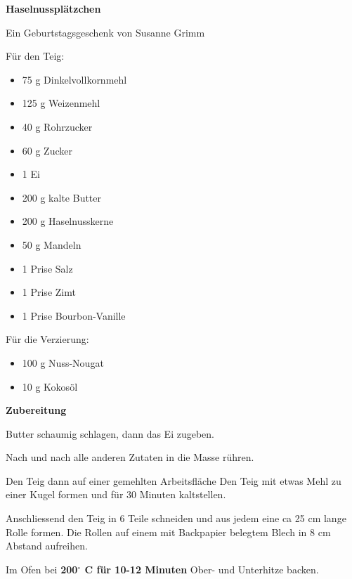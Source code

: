 

\parindent0pt	

\pagestyle{empty}


\textbf{{\LARGE Haselnussplätzchen}}%

\hrulefill

Ein Geburtstagsgeschenk von Susanne Grimm
\vspace*{\fill}
\begin{multicols}{2}	

Für den Teig:
\begin{itemize}
\item 75 g 	Dinkelvollkornmehl
\item 125 g 	Weizenmehl
\item 40 g 	Rohrzucker
\item 60 g 	Zucker
\item 1 	Ei
\item 200 g	kalte Butter
\item 200 g 	Haselnusskerne
\item 50 g 	Mandeln
\item 1 Prise	Salz
\item 1 Prise	Zimt
\item 1 Prise	Bourbon-Vanille
\end{itemize}

Für die Verzierung: 
\begin{itemize}
\item 100 g	Nuss-Nougat
\item 10 g	Kokosöl 	
\end{itemize}
\end{multicols}
\vfill									%




\vfill
\newpage
\textbf{{\LARGE Zubereitung}}%

\hrulefill

\vspace*{\fill}
\begin{multicols}{2}



Butter schaumig schlagen, dann das Ei zugeben.

Nach und nach alle anderen Zutaten in die Masse rühren.\newline

Den Teig dann auf einer gemehlten Arbeitsfläche
Den Teig mit etwas Mehl zu einer Kugel formen und für 30 Minuten kaltstellen.\newline

Anschliessend den Teig in 6 Teile schneiden und aus jedem
eine ca 25 cm lange Rolle formen.
Die Rollen auf einem mit Backpapier belegtem Blech in 8 cm Abstand
aufreihen.\newline

Im Ofen bei \textbf{200$^\circ$ C für 10-12 Minuten} Ober- und Unterhitze backen.

\end{multicols}
\vfill
